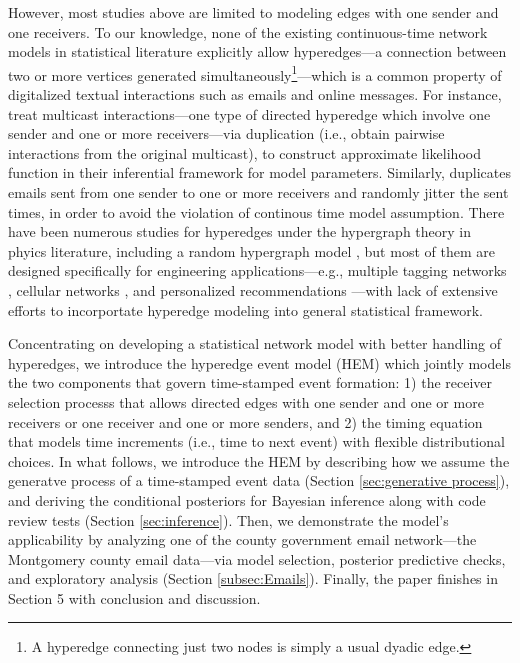\documentclass[ba]{imsart}
\numberwithin{equation}{section}
\theoremstyle{plain}
\begin{document}
However, most studies above are limited to modeling edges with one sender and one receivers. To our knowledge, none of the existing continuous-time network models in statistical literature explicitly allow hyperedges---a connection between two or more vertices generated simultaneously\footnote{A hyperedge connecting just two nodes is simply a usual dyadic edge.}---which is a common property of digitalized textual interactions such as emails and online messages. For instance, \cite{PerryWolfe2012} treat multicast interactions---one type of directed hyperedge which involve one sender and one or more receivers---via duplication (i.e., obtain pairwise interactions from the original multicast), to construct approximate likelihood function in their inferential framework for model parameters. Similarly, \cite{fan2009learning} duplicates emails sent from one sender to one or more receivers and randomly jitter the sent times, in order to avoid the violation of continous time model assumption. There have been numerous studies for hyperedges under the hypergraph theory \citep{karypis1999multilevel} in phyics literature, including a random hypergraph model \citep{ghoshal2009random}, but most of them are designed specifically for engineering applications---e.g., multiple tagging networks \citep{zlatic2009hypergraph,zhang2010hypergraph}, cellular networks \citep{klamt2009hypergraphs}, and personalized recommendations \citep{zhang2010personalized,blattner2009b}---with lack of extensive efforts to incorportate hyperedge modeling into general statistical framework.

Concentrating on developing a statistical network model with better handling of hyperedges, we introduce the hyperedge event model (HEM) which jointly models the two components that govern time-stamped event formation: 1) the receiver selection processs that allows directed edges with one sender and one or more receivers or one receiver and one or more senders, and 2) the timing equation that models time increments (i.e., time to next event) with flexible distributional choices. In what follows, we introduce the HEM by describing how we assume the generatve process of a time-stamped event data (Section \ref{sec:generative process}), and deriving the conditional posteriors for Bayesian inference along with code review tests (Section \ref{sec:inference}). Then, we demonstrate the model's applicability by analyzing one of the county government email network---the Montgomery county email data---via model selection, posterior predictive checks, and exploratory analysis (Section \ref{subsec:Emails}). Finally, the paper finishes in Section 5 with conclusion and discussion.
\end{document}
